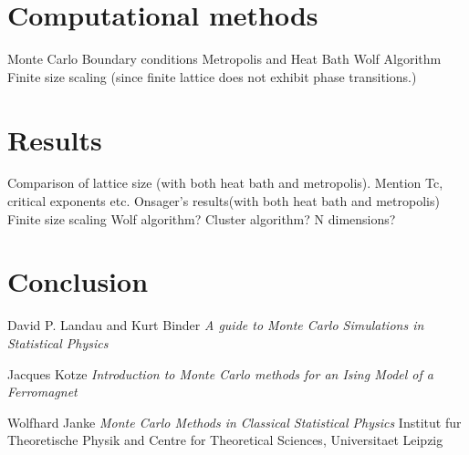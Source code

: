 \documentclass[12pt]{article}
\begin{document}
\section{Computational methods}
Monte Carlo 
Boundary conditions
Metropolis and Heat Bath
Wolf Algorithm
Finite size scaling (since finite lattice does not exhibit phase transitions.)


\section{Results}
Comparison of lattice size (with both heat bath and metropolis). Mention Tc, critical exponents etc.
Onsager's results(with both heat bath and metropolis)
Finite size scaling
Wolf algorithm?
Cluster algorithm?
N dimensions?


\section{Conclusion}

\begin{thebibliography}{}
David P. Landau and Kurt Binder
\emph{A guide to Monte Carlo Simulations in Statistical Physics}

Jacques Kotze
\emph{Introduction to Monte Carlo methods for an Ising Model of a Ferromagnet}

Wolfhard Janke
\emph{Monte Carlo Methods in Classical Statistical Physics}
Institut fur Theoretische Physik and Centre for Theoretical Sciences, Universitaet Leipzig

\end{thebibliography}{}


\end{document}
